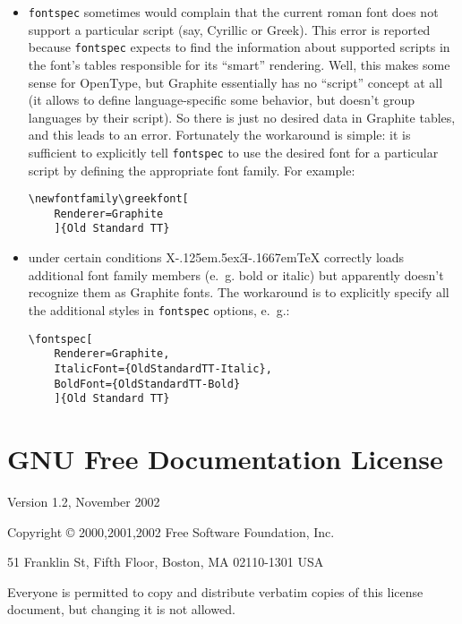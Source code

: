 \documentclass[12pt,a4paper,openany]{book}
\providecommand{\XeTeX}{X\kern-.125em\lower.5ex\hbox{Ǝ}\kern-.1667em\TeX}
\begin{document}
\begin{itemize}

\item \texttt{fontspec} sometimes would complain that the current roman font does not
support a particular script (say, Cyrillic or Greek). This error is reported because
\texttt{fontspec} expects to find the information about supported scripts in
the font's tables responsible for its “smart” rendering. Well, this makes some sense
for OpenType, but Graphite essentially has no “script” concept at all (it allows
to define language-specific some behavior, but doesn't group languages by their
script). So there is just no desired data in Graphite tables, and this leads
to an error. Fortunately the workaround is simple: it is sufficient to explicitly
tell \texttt{fontspec} to use the desired font for a particular script by defining
the appropriate font family. For example:

\begin{verbatim}
\newfontfamily\greekfont[
	Renderer=Graphite
	]{Old Standard TT}
\end{verbatim}

\item under certain conditions \XeTeX{} correctly loads additional font family
members (e.~g. bold or italic) but apparently doesn't recognize them as Graphite
fonts. The workaround is to explicitly specify all the additional styles in
\texttt{fontspec} options, e.~g.:

\begin{verbatim}
\fontspec[
    Renderer=Graphite,
    ItalicFont={OldStandardTT-Italic},
    BoldFont={OldStandardTT-Bold}
    ]{Old Standard TT}
\end{verbatim}

\end{itemize}

\chapter{GNU Free Documentation License}
\label{FDL}

\begin{center}

Version 1.2, November 2002

Copyright \copyright{} 2000,2001,2002  Free Software Foundation, Inc.
 
\bigskip
 
51 Franklin St, Fifth Floor, Boston, MA  02110-1301  USA
  
\bigskip
 
Everyone is permitted to copy and distribute verbatim copies of this
license document, but changing it is not allowed.

\end{center}
\end{document}
